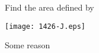 \documentclass[14pt,fleqn]{extarticle}
\begin{document}
 
\begin{question}
	\statement 
    
    Find the area defined by 
    
    \begin{step}
  \begin{options} 
     \correct 
       
       \begin{center}
\texttt{[image: 1426-J.eps]}
\end{center}
        
    \end{options} 
     \reason
     
     Some reason  
       
\end{step} 
\end{question} 
\end{document}
